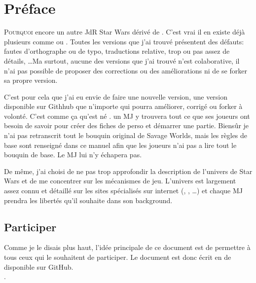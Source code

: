 \onecolumn
\section{Préface}

\lettrine{P}{ourquoi} encore un autre JdR {\jedifont Star Wars} dérivé de . C'est vrai il en existe déjà plusieurs comme  ou . Toutes les versions que j'ai trouvé présentent des défauts: fautes d'orthographe ou de typo, traductions relative, trop ou pas assez de détails, \ldots Ma surtout, aucune des versions que j'ai trouvé n'est colaborative, il n'ai pas possible de proposer des corrections ou des améliorations ni de se forker sa propre version.

C'est pour cela que j'ai eu envie de faire une nouvelle version, une version disponible sur Githhub que n'importe qui pourra améliorer, corrigé ou forker à volonté. C'est comme ça qu'est né \doctitle. un MJ y trouvera tout ce que ses joueurs ont besoin de savoir pour créer des fiches de perso et démarrer une partie. Biensûr je n'ai pas retranscrit tout le bouquin original de Savage Worlds, mais les règles de base sont renseigné dans ce manuel afin que les joueurs n'ai pas a lire tout le bouquin de base. Le MJ lui n'y échapera pas.

De même, j'ai choisi de ne pas trop approfondir la description de l'univers de Star Wars et de me concentrer sur les mécanismes de jeu. L'univers est largement assez connu et détaillé sur les sites spécialisés sur internet (, , \ldots) et chaque MJ prendra les libertés qu'il souhaite dans son background.

\subsection{Participer}
Comme je le disais plus haut, l'idée principale de ce document est de permettre à tous ceux qui le souhaitent de participer. Le document est donc écrit en \latex de disponible sur GitHub.\\
\cite{website:jdrp-starwars-reloaded}.

\twocolumn